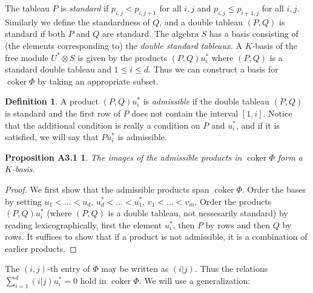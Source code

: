 \documentclass{tran-l}
\theoremstyle{plain}
\newtheorem*{theorem19}{Proposition A3.1}
\theoremstyle{remark}
\theoremstyle{definition}
\newtheorem*{definition4}{Definition}
\newcommand{\coker}{\operatorname{coker}}
\begin{document}
The tableau $P$ is {\em standard\/} if
$p_{i,j}<p_{i,j+1}$ for all $i,j$ and $p_{i,j}\le p_{i+1,j}$ for all
$i, j$. Similarly we define the standardness of $Q$, and a double
tableau $(P, Q)$ is standard if both $P$ and $Q$ are standard.
The algebra $S$ has a basis consisting of (the elements corresponding
to) the {\em double standard tableaux.\/} 
A $K$-basis of the free module $U^{*}\otimes S$ is given by 
the products
$(P, Q)u_{i}^{*}$ where $(P, Q)$ is a standard double tableau and 
$1\le i\le d$. Thus we can construct a basis for $\coker \Phi $
by taking an appropriate subset.

\begin{definition4} A product $(P, Q)u_{i}^{*}$ is {\em admissible\/}
 if the
double tableau $(P, Q)$ is standard and the first row of $P$ does not
contain the interval $[1,i]$. Notice that the additional condition
is really a condition on $P$ and $u_{i}^{*}$,
and if it is satisfied, we will say that $P u_{i}^{*}$ is admissible.
\end{definition4}
\begin{theorem19} The images of the
admissible products in $\coker \Phi $ form a $K$-basis.
\end{theorem19}
\begin{proof}  
We first show that the
admissible products span
$\coker \Phi $.
Order the bases by setting $u_{1} <\ldots <u_{d}$, $u_{d}^{*}<\ldots <u_{1}^{*}$, $v_{1} <\ldots <v_{m}$. 
Order the products $(P, Q)u_{i}^{*}$ (where $(P, Q)$ is a double
tableau, not nessesarily standard) by reading lexicographically,
first the element
$u_{i}^{*}$, then $P$ by rows and then $Q$ by rows. It
suffices to show that if a
product is not admissible, it is a combination of earlier
products.
\renewcommand{\qed}{} \end{proof}


The $(i,j)$-th entry of $\Phi $ may be written
as $(i|j)$. Thus the relations
$\sum _{i=1}^{d} (i | j)u_{i}^{*} =0$
hold in $\coker \Phi $. We will use a generalization:
\end{document}
